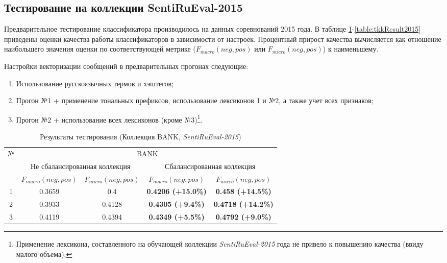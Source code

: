 \newpage
\subsection{Тестирование на коллекции SentiRuEval-2015}
\label{sec:test2015}
Предварительное тестирование классификатора производилось на данных
соревнований 2015 года.
В таблице \ref{table:bankResult2015}-\ref{table:tkkResult2015} приведены оценки
качества работы классификаторов в зависимости от настроек.
Процентный прирост качества вычисляется как отношение наибольшего значения оценки по
соответствующей метрике ($F_{macro}(neg, pos)$ или $F_{micro}(neg, pos)$) к
наименьшему.

Настройки векторизации сообщений в предварительных прогонах следующие:
\begin{enumerate}
    \item Использование русскоязычных термов и хэштегов;
    \item Прогон №1 + применение тональных префиксов, использование лексиконов 1
        и №2, а также учет всех признаков;
    \item Прогон №2 + использование всех лексиконов (кроме №3)\footnote{
        Применение лексикона, составленного на обучающей коллекции {\it SentiRuEval-2015}
        года не привело к повышению качества (ввиду малого объема).
    }.
\end{enumerate}

\begin{table}[ht!]
\centering
\caption{Результаты тестирования (Коллекция BANK, {\it SentiRuEval-2015})}
\label{table:bankResult2015}
\begin{tabular}{|c|c|c|c|c|}
\hline
\multirow{3}{*}{№} & \multicolumn{4}{c|}{BANK}                                                               \\ \cline{2-5}
                   & \multicolumn{2}{c|}{Не сбалансированная коллекция} & \multicolumn{2}{c|}{Сбалансированная коллекция} \\ \cline{2-5}
                   & $F_{macro}(neg, pos)$    & $F_{micro}(neg, pos)$   & $F_{macro}(neg, pos)$  & $F_{micro}(neg, pos)$  \\ \hline
1                  & 0.3659                   & 0.4                     & {\bf 0.4206 (+15.0\%)}       & {\bf 0.458 (+14.5\%) }       \\ \hline
2                  & 0.3933                   & 0.4128                  & {\bf 0.4305 (+9.4\%) }       & {\bf 0.4718 (+14.2\%)}       \\ \hline
3                  & 0.4119                   & 0.4394                  & {\bf 0.4349 (+5.5\%) }       & {\bf 0.4792 (+9.0\%) }       \\ \hline
\end{tabular}
\end{table}

